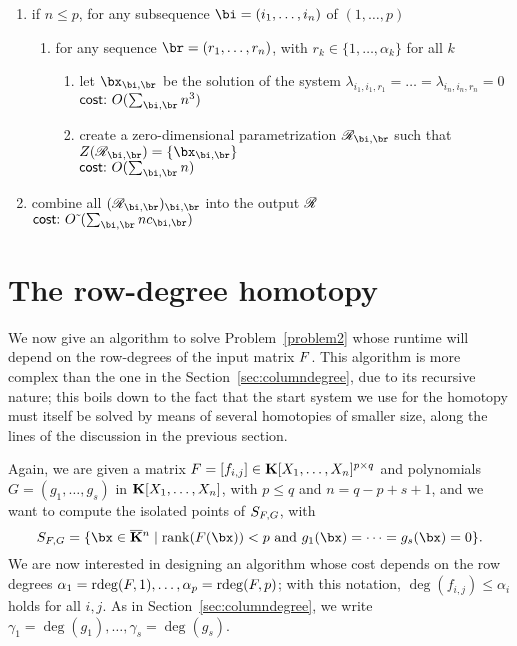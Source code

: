 \documentclass[12pt]{article}
\begin{document}
\begin{algorithm}[!h]
\begin{enumerate}
\item if $n \le p$, for any subsequence $\bi = (i_1, \ldots, i_n)$ of $(1, \ldots, p)$
  \begin{enumerate}
  \item for any sequence $\br = (r_1, \ldots, r_n)$, with $r_k \in \{1,\dots,\alpha_k\}$ for all $k$
    \begin{enumerate}
    \item let $\bx_{\bi,\br}$ be the solution of the system $\lambda_{i_1,i_1,r_1}=\dots=\lambda_{i_n,i_n,r_n}=0$\\
      $\text{\sf{cost:~}} O(\sum_{\bi,\br}n^3)$
    \item create a zero-dimensional parametrization $\scrR_{\bi,\br}$ such that $Z(\scrR_{\bi,\br})=\{\bx_{\bi,\br}\}$\\
      $\text{\sf{cost:~}} O(\sum_{\bi,\br}n)$
  \end{enumerate}
\end{enumerate}
\item combine all $(\scrR_{\bi,\br})_{\bi,\br}$ into the output $\mathscr{R}$\\
  $\text{\sf{cost:~}} \softO(\sum_{\bi,\br} n c_{\bi,\br})$
\end{enumerate}
\label{Row}
\end{algorithm}




\section{The row-degree homotopy}\label{sec:rowdegree}

We now give an algorithm to solve Problem~\ref{problem2} whose runtime
will depend on the row-degrees of the input matrix ${F}$. This
algorithm is more complex than the one in the
Section~\ref{sec:columndegree}, due to its recursive nature; this
boils down to the fact that the start system we use for the homotopy
must itself be solved by means of several homotopies of smaller size,
along the lines of the discussion in the previous section.

Again, we are given a matrix ${F} =[f_{i,j}]\in \mathbf{K}[X_1,\dots,X_n]^{p
  \times q}$ and polynomials $G=(g_1,\dots,g_s)$ in
$\mathbf{K}[X_1,\dots,X_n]$, with $p \leq q$ and $n = q-p+s+1$, and we want to
compute the isolated points of $S_{{F},G}$, with
$$S_{\mF,G} = \{\bx \in \KKbar{}^n \mid \mathrm{rank}(\mF({\bx})) < p
\text{~and~} g_1(\bx)=\cdots=g_s(\bx)=0\}.$$ We are now interested in
designing an algorithm whose cost depends on the row degrees
$\alpha_1=\mathrm{rdeg}({F},1),\dots,\alpha_p=\mathrm{rdeg}({F},p)$; with this
notation, $\deg(f_{i,j}) \leq \alpha_i$ holds for all $i,j$. As in 
Section~\ref{sec:columndegree}, we write
$\gamma_1=\deg(g_1),\dots,\gamma_s=\deg(g_s)$.
\end{document}
